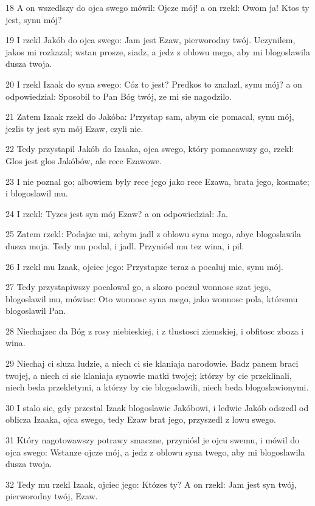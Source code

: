 \par 18 A on wszedlszy do ojca swego mówil: Ojcze mój! a on rzekl: Owom ja! Ktos ty jest, synu mój?
\par 19 I rzekl Jakób do ojca swego: Jam jest Ezaw, pierworodny twój. Uczynilem, jakos mi rozkazal; wstan prosze, siadz, a jedz z oblowu mego, aby mi blogoslawila dusza twoja.
\par 20 I rzekl Izaak do syna swego: Cóz to jest? Predkos to znalazl, synu mój? a on odpowiedzial: Sposobil to Pan Bóg twój, ze mi sie nagodzilo.
\par 21 Zatem Izaak rzekl do Jakóba: Przystap sam, abym cie pomacal, synu mój, jezlis ty jest syn mój Ezaw, czyli nie.
\par 22 Tedy przystapil Jakób do Izaaka, ojca swego, który pomacawszy go, rzekl: Glos jest glos Jakóbów, ale rece Ezawowe.
\par 23 I nie poznal go; albowiem byly rece jego jako rece Ezawa, brata jego, kosmate; i blogoslawil mu.
\par 24 I rzekl: Tyzes jest syn mój Ezaw? a on odpowiedzial: Ja.
\par 25 Zatem rzekl: Podajze mi, zebym jadl z oblowu syna mego, abyc blogoslawila dusza moja. Tedy mu podal, i jadl. Przyniósl mu tez wina, i pil.
\par 26 I rzekl mu Izaak, ojciec jego: Przystapze teraz a pocaluj mie, synu mój.
\par 27 Tedy przystapiwszy pocalowal go, a skoro poczul wonnosc szat jego, blogoslawil mu, mówiac: Oto wonnosc syna mego, jako wonnosc pola, któremu blogoslawil Pan.
\par 28 Niechajzec da Bóg z rosy niebieskiej, i z tlustosci ziemskiej, i obfitosc zboza i wina.
\par 29 Niechaj ci sluza ludzie, a niech ci sie klaniaja narodowie. Badz panem braci twojej, a niech ci sie klaniaja synowie matki twojej; którzy by cie przeklinali, niech beda przekletymi, a którzy by cie blogoslawili, niech beda blogoslawionymi.
\par 30 I stalo sie, gdy przestal Izaak blogoslawic Jakóbowi, i ledwie Jakób odszedl od oblicza Izaaka, ojca swego, tedy Ezaw brat jego, przyszedl z lowu swego.
\par 31 Który nagotowawszy potrawy smaczne, przyniósl je ojcu swemu, i mówil do ojca swego: Wstanze ojcze mój, a jedz z oblowu syna twego, aby mi blogoslawila dusza twoja.
\par 32 Tedy mu rzekl Izaak, ojciec jego: Któzes ty? A on rzekl: Jam jest syn twój, pierworodny twój, Ezaw.
